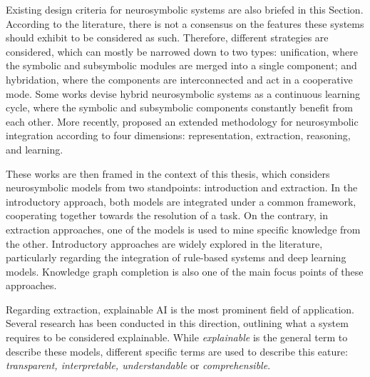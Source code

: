 Existing design criteria for neurosymbolic systems are also briefed in this Section. According to the literature, there is not a consensus on the features these systems should exhibit to be considered as such. Therefore, different strategies are considered, which can mostly be narrowed down to two types: unification, where the symbolic and subsymbolic modules are merged into a single component; and hybridation, where the components are interconnected and act in a cooperative mode. Some works devise hybrid neurosymbolic systems as a continuous learning cycle, where the symbolic and subsymbolic components constantly benefit from each other. More recently, \cite{garcez_neural-symbolic_2019} proposed an extended methodology for neurosymbolic integration according to four dimensions: representation, extraction, reasoning, and learning.

These works are then framed in the context of this thesis, which considers neurosymbolic models from two standpoints: introduction and extraction. In the introductory approach, both models are integrated under a common framework, cooperating together towards the resolution of a task. On the contrary, in extraction approaches, one of the models is used to mine specific knowledge from the other. Introductory approaches are widely explored in the literature, particularly regarding the integration of rule-based systems and deep learning models. Knowledge graph completion is also one of the main focus points of these approaches. 

Regarding extraction, explainable AI is the most prominent field of application. Several research has been conducted in this direction, outlining what a system requires to be considered explainable. While \textit{explainable} is the general term to describe these models, different specific terms are used to describe this eature: \textit{transparent, interpretable, understandable} or \textit{comprehensible}. 

